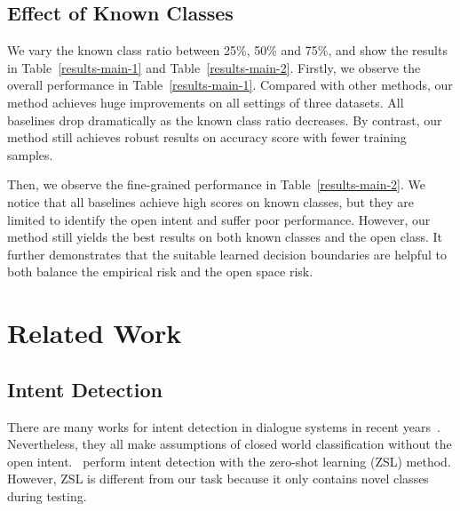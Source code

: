 \documentclass[letterpaper]{article} %
\begin{document}
\vspace{-1.04mm}
\vspace{-1.82mm}
\subsection{Effect of Known Classes}
We vary the known class ratio between 25\%, 50\% and 75\%, and show the results in Table~\ref{results-main-1} and Table~\ref{results-main-2}. Firstly, we observe the overall performance in Table~\ref{results-main-1}. Compared with other methods, our method achieves huge improvements on all settings of three datasets. All baselines drop dramatically as the known class ratio decreases. By contrast, our method still achieves robust results on accuracy score with fewer training samples.

Then, we observe the fine-grained performance in Table~\ref{results-main-2}. We notice that all baselines achieve high scores on known classes, but they are limited to identify the open intent and suffer poor performance. However, our method still yields the best results on both known classes and the open class. It further demonstrates that the suitable learned decision boundaries are helpful to both balance the empirical risk and the open space risk.

\vspace{-1.16mm}
\vspace{-2.07mm}
\section{Related Work}
\subsection{Intent Detection}
There are many works for intent detection in dialogue systems in recent years~\cite{ijcai2020-532,Qin_Che_Li_Ni_Liu_2020,zhang-etal-2019-joint,e-etal-2019-novel,qin-etal-2019-stack}. Nevertheless, they all make assumptions of closed world classification without the open intent.~\citet{srivastava-etal-2018-zero} perform intent detection with the zero-shot learning (ZSL) method. However, ZSL is different from our task because it only contains novel classes during testing.
\end{document}
